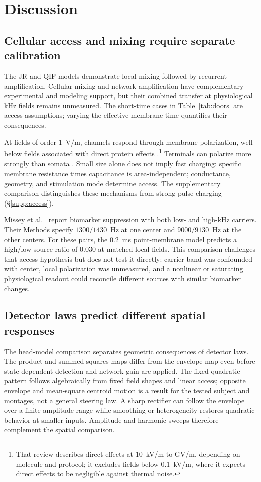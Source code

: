 \section{Discussion}\label{sec:discussion}
\subsection{Cellular access and mixing require separate calibration}
The JR and QIF models demonstrate local mixing followed by recurrent
amplification. Cellular mixing \cite{mirzakhalili2020,luff2024mixer} and network
amplification \cite{caldas2024,karimi2024,esmaeilpour2021} have complementary
experimental and modeling support, but their combined transfer at physiological
kHz fields remains unmeasured. The short-time cases in Table~\ref{tab:doors}
are access assumptions; varying the effective membrane time quantifies their
consequences.

At fields of order $1$~V/m, channels respond through membrane polarization,
well below fields associated with direct protein effects
\cite{cifra2026}.\footnote{That review describes direct effects at $10$~kV/m
to GV/m, depending on molecule and protocol; it excludes fields below
$0.1$~kV/m, where it expects direct effects to be negligible against thermal noise.}
Terminals can polarize more strongly than somata
\cite{rahman2013,aberra2023,chakraborty2018}. Small size alone does not imply
fast charging: specific membrane resistance times capacitance is area-independent;
conductance, geometry, and stimulation mode determine access. The supplementary
comparison distinguishes these mechanisms from strong-pulse charging
(\S\ref{supp:access}).
\ifjne\else

\fi

Missey et al.\ \cite{missey2026} report biomarker suppression with both
low- and high-kHz carriers. Their Methods specify $1300/1430$~Hz at one
center and $9000/9130$~Hz at the other centers. For these pairs, the
$0.2$~ms point-membrane model predicts a high/low source ratio of $0.030$
at matched local fields. This comparison challenges that access hypothesis
but does not test it directly: carrier band was confounded with center,
local polarization was unmeasured, and a nonlinear or saturating physiological
readout could reconcile different sources with similar biomarker changes.

\subsection{Detector laws predict different spatial responses}
The head-model comparison separates geometric consequences of detector laws.
The product and summed-squares maps differ from the envelope map even before
state-dependent detection and network gain are applied. The fixed quadratic
pattern follows algebraically from fixed field shapes and linear access;
opposite envelope and mean-square centroid motion is a result for the tested
subject and montages, not a general steering law. A sharp rectifier can follow
the envelope over a finite amplitude range while smoothing or heterogeneity
restores quadratic behavior at smaller inputs. Amplitude and harmonic sweeps
therefore complement the spatial comparison.

